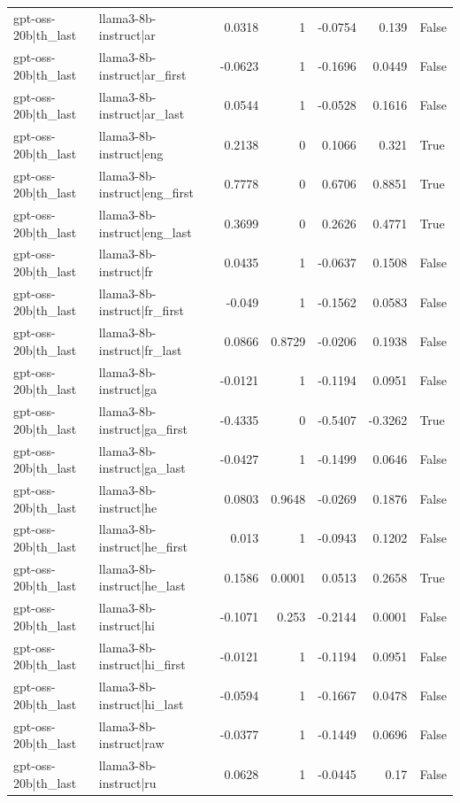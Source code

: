 \begin{table}
\begin{tabular}{l l r r r r l}
gpt-oss-20b|th_last & llama3-8b-instruct|ar & 0.0318 & 1 & -0.0754 & 0.139 & False \\
gpt-oss-20b|th_last & llama3-8b-instruct|ar_first & -0.0623 & 1 & -0.1696 & 0.0449 & False \\
gpt-oss-20b|th_last & llama3-8b-instruct|ar_last & 0.0544 & 1 & -0.0528 & 0.1616 & False \\
gpt-oss-20b|th_last & llama3-8b-instruct|eng & 0.2138 & 0 & 0.1066 & 0.321 & True \\
gpt-oss-20b|th_last & llama3-8b-instruct|eng_first & 0.7778 & 0 & 0.6706 & 0.8851 & True \\
gpt-oss-20b|th_last & llama3-8b-instruct|eng_last & 0.3699 & 0 & 0.2626 & 0.4771 & True \\
gpt-oss-20b|th_last & llama3-8b-instruct|fr & 0.0435 & 1 & -0.0637 & 0.1508 & False \\
gpt-oss-20b|th_last & llama3-8b-instruct|fr_first & -0.049 & 1 & -0.1562 & 0.0583 & False \\
gpt-oss-20b|th_last & llama3-8b-instruct|fr_last & 0.0866 & 0.8729 & -0.0206 & 0.1938 & False \\
gpt-oss-20b|th_last & llama3-8b-instruct|ga & -0.0121 & 1 & -0.1194 & 0.0951 & False \\
gpt-oss-20b|th_last & llama3-8b-instruct|ga_first & -0.4335 & 0 & -0.5407 & -0.3262 & True \\
gpt-oss-20b|th_last & llama3-8b-instruct|ga_last & -0.0427 & 1 & -0.1499 & 0.0646 & False \\
gpt-oss-20b|th_last & llama3-8b-instruct|he & 0.0803 & 0.9648 & -0.0269 & 0.1876 & False \\
gpt-oss-20b|th_last & llama3-8b-instruct|he_first & 0.013 & 1 & -0.0943 & 0.1202 & False \\
gpt-oss-20b|th_last & llama3-8b-instruct|he_last & 0.1586 & 0.0001 & 0.0513 & 0.2658 & True \\
gpt-oss-20b|th_last & llama3-8b-instruct|hi & -0.1071 & 0.253 & -0.2144 & 0.0001 & False \\
gpt-oss-20b|th_last & llama3-8b-instruct|hi_first & -0.0121 & 1 & -0.1194 & 0.0951 & False \\
gpt-oss-20b|th_last & llama3-8b-instruct|hi_last & -0.0594 & 1 & -0.1667 & 0.0478 & False \\
gpt-oss-20b|th_last & llama3-8b-instruct|raw & -0.0377 & 1 & -0.1449 & 0.0696 & False \\
gpt-oss-20b|th_last & llama3-8b-instruct|ru & 0.0628 & 1 & -0.0445 & 0.17 & False \\

\end{tabular}
\end{table}
